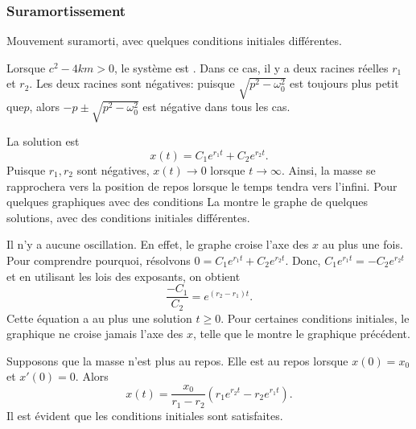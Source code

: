 \subsubsection{Suramortissement}

\begin{mywrapfig}[15]{3.25in}
\capstart
{}
\caption{Mouvement suramorti, avec quelques conditions initiales différentes.\label{mv:overdampedfig}}
\end{mywrapfig}
%
%

Lorsque
$c^2 - 4km > 0$, le système est \emph{}.  Dans ce cas, il y a deux racines réelles $r_1$ et $r_2$.  Les deux racines sont négatives:   puisque $\sqrt{p^2 - \omega_0^2}$ est toujours plus petit que$p$,
alors
$-p \pm \sqrt{p^2 - \omega_0^2}$ est négative dans tous les cas.


La solution est 
\begin{equation*}
x(t) = C_1 e^{r_1 t} + C_2 e^{r_2 t} .
\end{equation*}
Puisque  $r_1, r_2$ sont négatives, $x(t) \to 0$ lorsque $t \to \infty$.
Ainsi, la masse se rapprochera vers la position de repos lorsque le temps tendra vers l'infini. Pour quelques graphiques avec des conditions La  montre le graphe de quelques solutions, avec des conditions initiales différentes.


Il n'y a aucune oscillation. En effet, le graphe croise l'axe des 
$x$ au plus une fois.  Pour comprendre pourquoi, résolvons 
$0 = C_1 e^{r_1 t} + C_2 e^{r_2 t}$.
Donc, $C_1 e^{r_1 t} = - C_2 e^{r_2 t}$ et en utilisant les lois des exposants, on obtient  
\begin{equation*}
\frac{-C_1}{C_2} = e^{(r_2-r_1) t} .
\end{equation*}
Cette équation a au plus une solution  $t \geq 0$.  Pour certaines conditions initiales, le graphique ne croise jamais l'axe des $x$, telle que le montre le graphique précédent. 

\begin{example}
Supposons que la masse n'est plus au repos. Elle est au repos lorsque   
$x(0) = x_0$ et $x'(0) = 0$.
Alors
\begin{equation*}
x(t) = \frac{x_0}{r_1-r_2} \left(r_1 e^{r_2 t} - r_2 e^{r_1 t} \right) .
\end{equation*}
Il est évident que les conditions initiales sont satisfaites.
\end{example}

